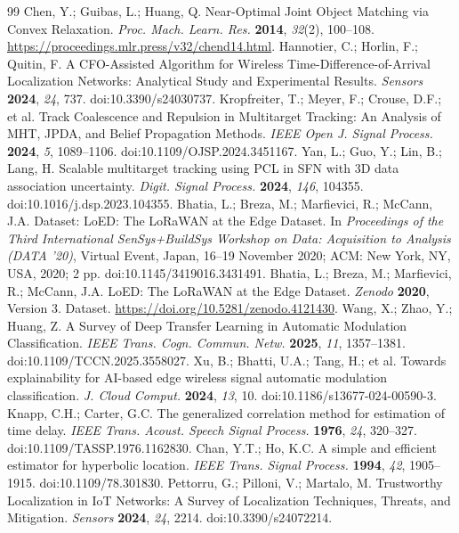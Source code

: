 \begin{thebibliography}{99}
 Chen, Y.; Guibas, L.; Huang, Q. Near-Optimal Joint Object Matching via Convex Relaxation. \emph{Proc. Mach. Learn. Res.} \textbf{2014}, \emph{32}(2), 100--108. \url{https://proceedings.mlr.press/v32/chend14.html}.
 Hannotier, C.; Horlin, F.; Quitin, F. A CFO-Assisted Algorithm for Wireless Time-Difference-of-Arrival Localization Networks: Analytical Study and Experimental Results. \emph{Sensors} \textbf{2024}, \emph{24}, 737. doi:10.3390/s24030737.
 Kropfreiter, T.; Meyer, F.; Crouse, D.F.; et al. Track Coalescence and Repulsion in Multitarget Tracking: An Analysis of MHT, JPDA, and Belief Propagation Methods. \emph{IEEE Open J. Signal Process.} \textbf{2024}, \emph{5}, 1089--1106. doi:10.1109/OJSP.2024.3451167.
 Yan, L.; Guo, Y.; Lin, B.; Lang, H. Scalable multitarget tracking using PCL in SFN with 3D data association uncertainty. \emph{Digit. Signal Process.} \textbf{2024}, \emph{146}, 104355. doi:10.1016/j.dsp.2023.104355.
 Bhatia, L.; Breza, M.; Marfievici, R.; McCann, J.A. Dataset: LoED: The LoRaWAN at the Edge Dataset. In \emph{Proceedings of the Third International SenSys+BuildSys Workshop on Data: Acquisition to Analysis (DATA '20)}, Virtual Event, Japan, 16--19 November 2020; ACM: New York, NY, USA, 2020; 2 pp. doi:10.1145/3419016.3431491.
 Bhatia, L.; Breza, M.; Marfievici, R.; McCann, J.A. LoED: The LoRaWAN at the Edge Dataset. \emph{Zenodo} \textbf{2020}, Version 3. Dataset. \url{https://doi.org/10.5281/zenodo.4121430}.
 Wang, X.; Zhao, Y.; Huang, Z. A Survey of Deep Transfer Learning in Automatic Modulation Classification. \emph{IEEE Trans. Cogn. Commun. Netw.} \textbf{2025}, \emph{11}, 1357--1381. doi:10.1109/TCCN.2025.3558027.
 Xu, B.; Bhatti, U.A.; Tang, H.; et al. Towards explainability for AI-based edge wireless signal automatic modulation classification. \emph{J. Cloud Comput.} \textbf{2024}, \emph{13}, 10. doi:10.1186/s13677-024-00590-3.
 Knapp, C.H.; Carter, G.C. The generalized correlation method for estimation of time delay. \emph{IEEE Trans. Acoust. Speech Signal Process.} \textbf{1976}, \emph{24}, 320--327. doi:10.1109/TASSP.1976.1162830.
 Chan, Y.T.; Ho, K.C. A simple and efficient estimator for hyperbolic location. \emph{IEEE Trans. Signal Process.} \textbf{1994}, \emph{42}, 1905--1915. doi:10.1109/78.301830.
 Pettorru, G.; Pilloni, V.; Martalo, M. Trustworthy Localization in IoT Networks: A Survey of Localization Techniques, Threats, and Mitigation. \emph{Sensors} \textbf{2024}, \emph{24}, 2214. doi:10.3390/s24072214.

\end{thebibliography}
